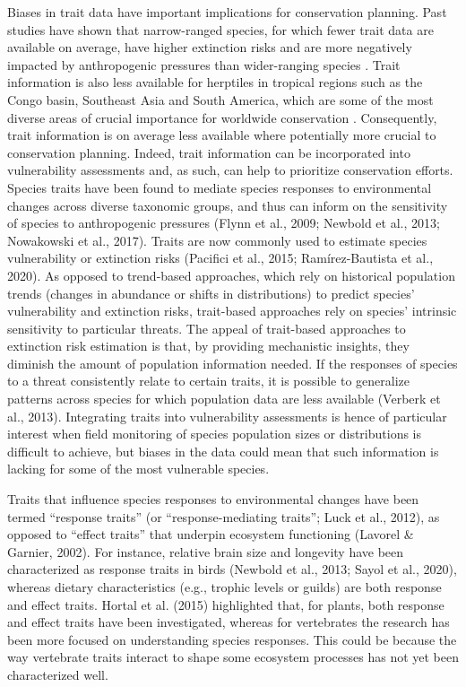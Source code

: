 Biases in trait data have important implications for conservation planning. Past studies have shown that narrow-ranged species, for which fewer trait data are available on average, have higher extinction risks \citep{Collen2016, Purvis2000, Ripple2017} and are more negatively impacted by anthropogenic pressures than wider-ranging species \citep{Newbold2018a}. Trait information is also less available for herptiles in tropical regions such as the Congo basin, Southeast Asia and South America, which are some of the most diverse areas of crucial importance for worldwide conservation \citep{Barlow2018}. Consequently, trait information is on average less available where potentially more crucial to conservation planning. Indeed, trait information can be incorporated into vulnerability assessments and, as such, can help to prioritize conservation efforts. Species traits have been found to mediate species responses to environmental changes across diverse taxonomic groups, and thus can inform on the sensitivity of species to anthropogenic pressures (Flynn et al., 2009; Newbold et al., 2013; Nowakowski et al., 2017). Traits are now commonly used to estimate species vulnerability or extinction risks (Pacifici et al., 2015; Ramírez-Bautista et al., 2020). As opposed to trend-based approaches, which rely on historical population trends (changes in abundance or shifts in distributions) to predict species’ vulnerability and extinction risks, trait-based approaches rely on species’ intrinsic sensitivity to particular threats. The appeal of trait-based approaches to extinction risk estimation is that, by providing mechanistic insights, they diminish the amount of population information needed. If the responses of species to a threat consistently relate to certain traits, it is possible to generalize patterns across species for which population data are less available (Verberk et al., 2013). Integrating traits into vulnerability assessments is hence of particular interest when field monitoring of species population sizes or distributions is difficult to achieve, but biases in the data could mean that such information is lacking for some of the most vulnerable species.

Traits that influence species responses to environmental changes have been termed “response traits” (or “response-mediating traits”; Luck et al., 2012), as opposed to “effect traits” that underpin ecosystem functioning (Lavorel \& Garnier, 2002). For instance, relative brain size and longevity have been characterized as response traits in birds (Newbold et al., 2013; Sayol et al., 2020), whereas dietary characteristics (e.g., trophic levels or guilds) are both response and effect traits. Hortal et al. (2015) highlighted that, for plants, both response and effect traits have been investigated, whereas for vertebrates the research has been more focused on understanding species responses. This could be because the way vertebrate traits interact to shape some ecosystem processes has not yet been characterized well.

